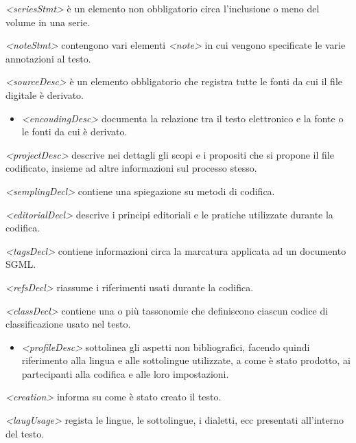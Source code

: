\documentclass[
  b5paper,
  twoside,
  11pt,
  chapterprefix=false,
  bibliography=totocnumbered,
  parskip=0]{scrbook}
\providecommand{\tightlist}{%
  \setlength{\itemsep}{0pt}\setlength{\parskip}{0pt}}
\begin{document}
\emph{\textless seriesStmt\textgreater{}} è un elemento non obbligatorio circa l'inclusione o
meno del volume in una serie.

\emph{\textless noteStmt\textgreater{}} contengono vari elementi \emph{\textless note\textgreater{}} in cui vengono
specificate le varie annotazioni al testo.

\emph{\textless sourceDesc\textgreater{}} è un elemento obbligatorio che registra tutte le fonti
da cui il file digitale è derivato.

\begin{itemize}
\tightlist
\item
  \emph{\textless encoudingDesc\textgreater{}} documenta la relazione tra il testo elettronico
  e la fonte o le fonti da cui è derivato.
\end{itemize}

\emph{\textless projectDesc\textgreater{}} descrive nei dettagli gli scopi e i propositi che si
propone il file codificato, insieme ad altre informazioni sul processo
stesso.

\emph{\textless semplingDecl\textgreater{}} contiene una spiegazione su metodi di codifica.

\emph{\textless editorialDecl\textgreater{}} descrive i principi editoriali e le pratiche
utilizzate durante la codifica.

\emph{\textless tagsDecl\textgreater{}} contiene informazioni circa la marcatura applicata ad un
documento SGML.

\emph{\textless refsDecl\textgreater{}} riassume i riferimenti usati durante la codifica.

\emph{\textless classDecl\textgreater{}} contiene una o più tassonomie che definiscono ciascun
codice di classificazione usato nel testo.

\begin{itemize}
\tightlist
\item
  \emph{\textless profileDesc\textgreater{}} sottolinea gli aspetti non bibliografici, facendo
  quindi riferimento alla lingua e alle sottolingue utilizzate, a come
  è stato prodotto, ai partecipanti alla codifica e alle loro
  impostazioni.
\end{itemize}

\emph{\textless creation\textgreater{}} informa su come è stato creato il testo.

\emph{\textless laugUsage\textgreater{}} regista le lingue, le sottolingue, i dialetti, ecc
presentati all'interno del testo.
\end{document}
